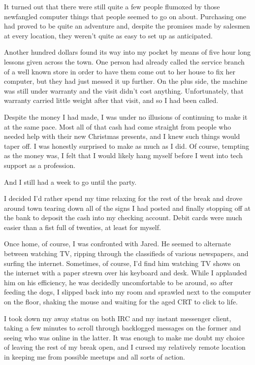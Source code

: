It turned out that there were still quite a few people flumoxed by those newfangled computer things that people seemed to go on about.  Purchasing one had proved to be quite an adventure and, despite the promises made by salesmen at every location, they weren't quite as easy to set up as anticipated.

Another hundred dollars found its way into my pocket by means of five hour long lessons given across the town.  One person had already called the service branch of a well known store in order to have them come out to her house to fix her computer, but they had just messed it up further.  On the plus side, the machine was still under warranty and the visit didn't cost anything.  Unfortunately, that warranty carried little weight after that visit, and so I had been called.

Despite the money I had made, I was under no illusions of continuing to make it at the same pace.  Most all of that cash had come straight from people who needed help with their new Christmas presents, and I knew such things would taper off.  I was honestly surprised to make as much as I did.  Of course, tempting as the money was, I felt that I would likely hang myself before I went into tech support as a profession.

And I still had a week to go until the party.

I decided I'd rather spend my time relaxing for the rest of the break and drove around town tearing down all of the signs I had posted and finally stopping off at the bank to deposit the cash into my checking account.  Debit cards were much easier than a fist full of twenties, at least for myself.

Once home, of course, I was confronted with Jared.  He seemed to alternate between watching TV, ripping through the classifieds of various newspapers, and surfing the internet.  Sometimes, of course, I'd find him watching TV shows on the internet with a paper strewn over his keyboard and desk.  While I applauded him on his efficiency, he was decidedly uncomfortable to be around, so after feeding the dogs, I slipped back into my room and sprawled next to the computer on the floor, shaking the mouse and waiting for the aged CRT to click to life.

I took down my away status on both IRC and my instant messenger client, taking a few minutes to scroll through backlogged messages on the former and seeing who was online in the latter.  It was enough to make me doubt my choice of leaving the rest of my break open, and I cursed my relatively remote location in keeping me from possible meetups and all sorts of action.

